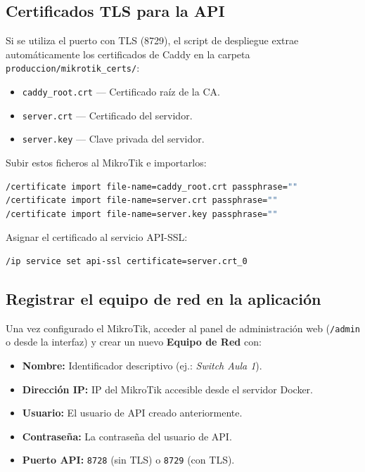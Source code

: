 \documentclass[12pt,a4paper]{article}
\begin{document}
\subsection{Certificados TLS para la API}

Si se utiliza el puerto con TLS (8729), el script de despliegue extrae automáticamente los certificados de Caddy en la carpeta \texttt{produccion/mikrotik\_certs/}:

\begin{itemize}
    \item \texttt{caddy\_root.crt} --- Certificado raíz de la CA.
    \item \texttt{server.crt} --- Certificado del servidor.
    \item \texttt{server.key} --- Clave privada del servidor.
\end{itemize}

Subir estos ficheros al MikroTik e importarlos:

\begin{lstlisting}[language=bash,title={RouterOS CLI}]
/certificate import file-name=caddy_root.crt passphrase=""
/certificate import file-name=server.crt passphrase=""
/certificate import file-name=server.key passphrase=""
\end{lstlisting}

Asignar el certificado al servicio API-SSL:

\begin{lstlisting}[language=bash,title={RouterOS CLI}]
/ip service set api-ssl certificate=server.crt_0
\end{lstlisting}

\subsection{Registrar el equipo de red en la aplicación}

Una vez configurado el MikroTik, acceder al panel de administración web (\texttt{/admin} o desde la interfaz) y crear un nuevo \textbf{Equipo de Red} con:

\begin{itemize}
    \item \textbf{Nombre:} Identificador descriptivo (ej.: \textit{Switch Aula 1}).
    \item \textbf{Dirección IP:} IP del MikroTik accesible desde el servidor Docker.
    \item \textbf{Usuario:} El usuario de API creado anteriormente.
    \item \textbf{Contraseña:} La contraseña del usuario de API.
    \item \textbf{Puerto API:} \texttt{8728} (sin TLS) o \texttt{8729} (con TLS).
\end{itemize}
\end{document}
